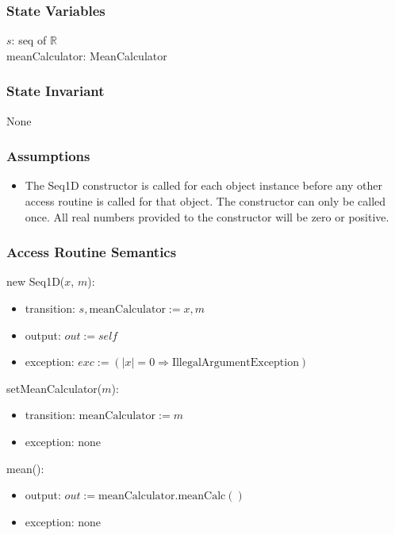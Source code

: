 \documentclass[12pt,fleqn]{examtst}
\begin{document}
\subsubsection* {State Variables}

$s$: seq of $\mathbb{R}$\\
meanCalculator: MeanCalculator

\subsubsection* {State Invariant}

None

\subsubsection* {Assumptions}

\begin{itemize}
\item The Seq1D constructor is called for each object instance before any other
  access routine is called for that object.  The constructor can only be called
  once.  All real numbers provided to the constructor will be zero or positive.
\end{itemize}

\subsubsection* {Access Routine Semantics}

new Seq1D($x$, $m$):
\begin{itemize}
\item transition: $s, \text{meanCalculator} := x, m$
\item output: $\mathit{out} := \mathit{self}$
\item exception:
  $\mathit{exc} := (|x| = 0 \Rightarrow \mbox{IllegalArgumentException})$
\end{itemize}

\noindent setMeanCalculator($m$):
\begin{itemize}
\item transition: $\mbox{meanCalculator} := m$
\item exception: none
\end{itemize}

\noindent mean():
\begin{itemize}
\item output: $\mathit{out} := \mbox{meanCalculator.meanCalc}()$
\item exception: none
\end{itemize}
\end{document}
